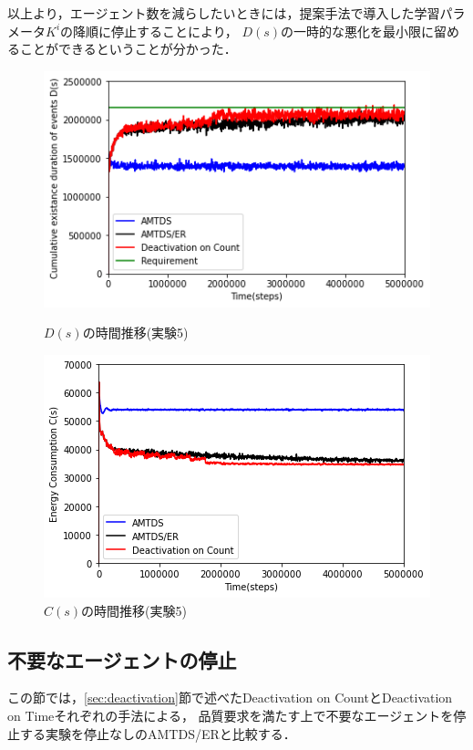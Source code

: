 \documentclass[12pt,a4j,twoside]{jarticle}
\begin{document}
  以上より，エージェント数を減らしたいときには，提案手法で導入した学習パラメータ$K^i$の降順に停止することにより，
  $D(s)$の一時的な悪化を最小限に留めることができるということが分かった．








  \begin{figure}
    \centering
    \includegraphics[width=0.9\hsize]{figures/ds_graph_3600_ave_CountStop_Office_600.png}
    \caption{$D(s)$の時間推移(実験5)}
    \label{fig:ds_CountStop}
    \vspace{12pt}
    \centering
    \includegraphics[width=0.9\hsize]{figures/cs_graph_3600_ave_CountStop_Office_600.png}
    \caption{$C(s)$の時間推移(実験5)}
    \label{fig:cs_CountStop}
  \end{figure}


  \subsection{不要なエージェントの停止}\label{ex:deactivation}
  この節では，\ref{sec:deactivation}節で述べたDeactivation on CountとDeactivation on Timeそれぞれの手法による，
  品質要求を満たす上で不要なエージェントを停止する実験を停止なしのAMTDS/ERと比較する．
\end{document}
